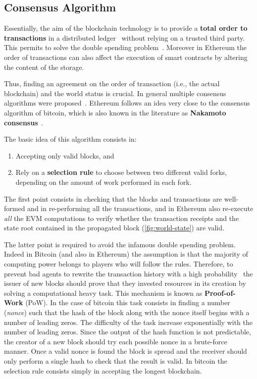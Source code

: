 \subsection{Consensus Algorithm}
\label{sec:consensus}

Essentially, the aim of the blockchain technology
is to provide a \textbf{total order to transactions} in a distributed
ledger~\cite{bib:the-quest} without relying on a trusted third party. 
This permits to solve the double spending problem~\cite{bib:bitcoin}.
Moreover in Ethereum the order of transactions can also affect the execution
of smart contracts by altering the content of the storage.

Thus, finding an agreement on the order of transaction (i.e., the actual
blockchain) and the world status is crucial.
In general multiple consensus algorithms were proposed~\cite{}. 
Ethereum
follows an idea very close to the consensus algorithm of bitcoin, which
is also known in the literature as \textbf{Nakamoto consensus}~\cite{}.

The basic idea of this algorithm consists in: 
\begin{enumerate}
\item Accepting only valid blocks, and
\item Rely on a \textbf{selection rule} to choose between two different 
valid forks, depending on the amount of work performed in each fork. 
\end{enumerate}

The first point consists in checking that the blocks and transactions are
well-formed and in re-performing all the transactions, and in Ethereum
also re-execute \emph{all} the EVM computations to verify whether the
transaction receipts and the state root contained in the propagated block 
(\autoref{fig:world-state}) are valid.

The latter point is required to avoid the infamous double spending problem.
Indeed in Bitcoin (and also in Ethereum) the assumption is that the majority
of computing power belongs to players who will follow the rules. Therefore,
to prevent bad agents to rewrite the transaction history with a high 
probability~\cite{bib:bitcoin} the issuer of
new blocks should prove that they invested resources in its creation by
solving a computational heavy task.
This mechanism is known as \textbf{Proof-of-Work} (PoW).
In the case of bitcoin this task consists in finding a number (\emph{nonce})
such that the hash of the block along with the nonce itself begins with a
number of leading zeros. The difficulty of the task increase exponentially
with the number of leading zeros.
Since the output of the hash function is not predictable, the creator of 
a new block should try each possible nonce in a brute-force manner.
Once a valid nonce is found the block is spread and the receiver should
only perform a single hash to check that the result is valid.
In bitcoin the selection rule consists simply in accepting the longest
blockchain.